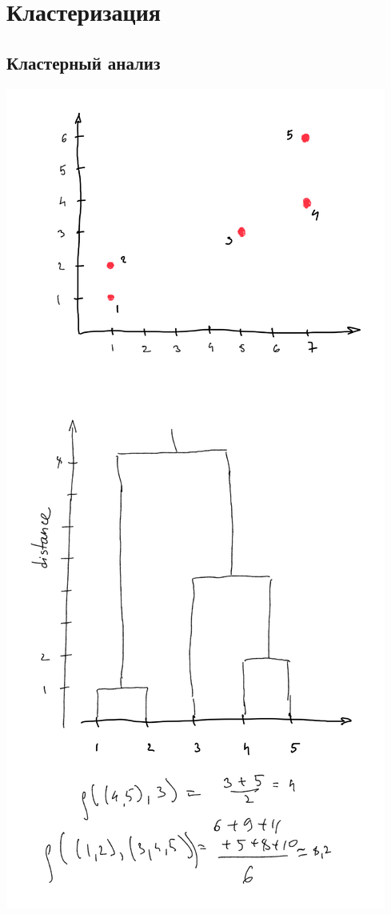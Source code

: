 \documentclass[a4paper, oneside]{book}
\begin{document}
\chapter{Кластеризация}

\section{Кластерный анализ}
\begin{marginfigure}
    \includegraphics[width=1.1\columnwidth]{pics/dendrogram.pdf}
    \label{fig:boxplot}
\end{marginfigure}
\end{document}
